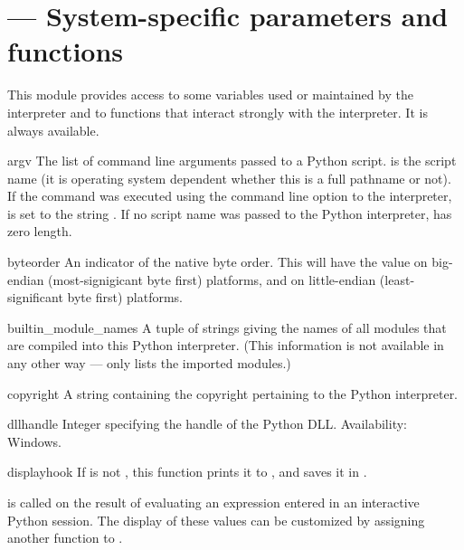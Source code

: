 \section{ ---
         System-specific parameters and functions}


This module provides access to some variables used or maintained by the
interpreter and to functions that interact strongly with the interpreter.
It is always available.


\begin{datadesc}{argv}
  The list of command line arguments passed to a Python script.
   is the script name (it is operating system
  dependent whether this is a full pathname or not).
  If the command was executed using the  command line
  option to the interpreter,  is set to the string
  .
  If no script name was passed to the Python interpreter,
   has zero length.
\end{datadesc}

\begin{datadesc}{byteorder}
  An indicator of the native byte order.  This will have the value
   on big-endian (most-signigicant byte first) platforms,
  and  on little-endian (least-significant byte first)
  platforms.
\end{datadesc}

\begin{datadesc}{builtin_module_names}
  A tuple of strings giving the names of all modules that are compiled
  into this Python interpreter.  (This information is not available in
  any other way ---  only lists the imported
  modules.)
\end{datadesc}

\begin{datadesc}{copyright}
A string containing the copyright pertaining to the Python interpreter.
\end{datadesc}

\begin{datadesc}{dllhandle}
Integer specifying the handle of the Python DLL.
Availability: Windows.
\end{datadesc}

\begin{funcdesc}{displayhook}{}
If  is not , this function prints it to 
, and saves it in .

 is called on the result of evaluating
an expression entered in an interactive Python session.
The display of these values can be customized by assigning
another function to .
\end{funcdesc}

